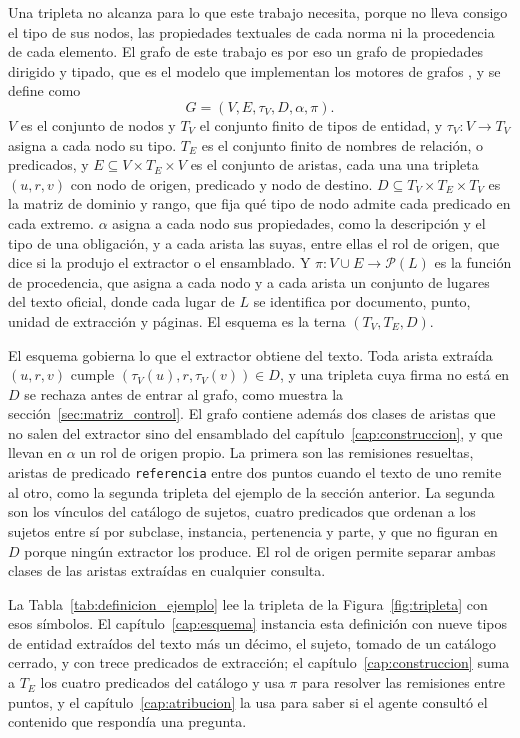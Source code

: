 \documentclass[12pt,a4paper]{report}
\begin{document}
Una tripleta no alcanza para lo que este trabajo necesita, porque no lleva consigo el tipo de sus nodos, las propiedades textuales de cada norma ni la procedencia de cada elemento. El grafo de este trabajo es por eso un grafo de propiedades dirigido y tipado, que es el modelo que implementan los motores de grafos \cite{hogan2021kg}, y se define como
\begin{equation}
  G = (V, E, \tau_V, D, \alpha, \pi).
\end{equation}
$V$ es el conjunto de nodos y $T_V$ el conjunto finito de tipos de entidad, y $\tau_V : V \to T_V$ asigna a cada nodo su tipo. $T_E$ es el conjunto finito de nombres de relación, o predicados, y $E \subseteq V \times T_E \times V$ es el conjunto de aristas, cada una una tripleta $(u, r, v)$ con nodo de origen, predicado y nodo de destino. $D \subseteq T_V \times T_E \times T_V$ es la matriz de dominio y rango, que fija qué tipo de nodo admite cada predicado en cada extremo. $\alpha$ asigna a cada nodo sus propiedades, como la descripción y el tipo de una obligación, y a cada arista las suyas, entre ellas el rol de origen, que dice si la produjo el extractor o el ensamblado. Y $\pi : V \cup E \to \mathcal{P}(L)$ es la función de procedencia, que asigna a cada nodo y a cada arista un conjunto de lugares del texto oficial, donde cada lugar de $L$ se identifica por documento, punto, unidad de extracción y páginas. El esquema es la terna $(T_V, T_E, D)$.

El esquema gobierna lo que el extractor obtiene del texto. Toda arista extraída $(u, r, v)$ cumple $(\tau_V(u), r, \tau_V(v)) \in D$, y una tripleta cuya firma no está en $D$ se rechaza antes de entrar al grafo, como muestra la sección~\ref{sec:matriz_control}. El grafo contiene además dos clases de aristas que no salen del extractor sino del ensamblado del capítulo~\ref{cap:construccion}, y que llevan en $\alpha$ un rol de origen propio. La primera son las remisiones resueltas, aristas de predicado \texttt{referencia} entre dos puntos cuando el texto de uno remite al otro, como la segunda tripleta del ejemplo de la sección anterior. La segunda son los vínculos del catálogo de sujetos, cuatro predicados que ordenan a los sujetos entre sí por subclase, instancia, pertenencia y parte, y que no figuran en $D$ porque ningún extractor los produce. El rol de origen permite separar ambas clases de las aristas extraídas en cualquier consulta.

La Tabla~\ref{tab:definicion_ejemplo} lee la tripleta de la Figura~\ref{fig:tripleta} con esos símbolos. El capítulo~\ref{cap:esquema} instancia esta definición con nueve tipos de entidad extraídos del texto más un décimo, el sujeto, tomado de un catálogo cerrado, y con trece predicados de extracción; el capítulo~\ref{cap:construccion} suma a $T_E$ los cuatro predicados del catálogo y usa $\pi$ para resolver las remisiones entre puntos, y el capítulo~\ref{cap:atribucion} la usa para saber si el agente consultó el contenido que respondía una pregunta.
\end{document}
